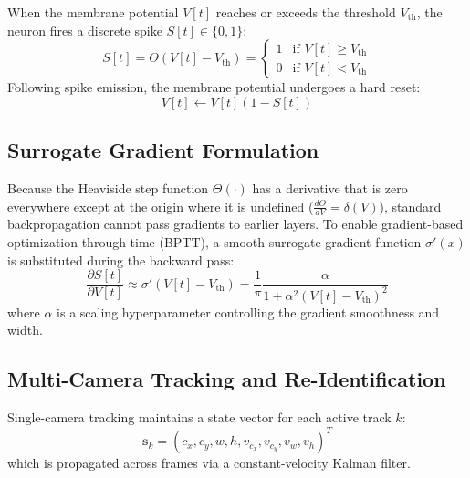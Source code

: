 \documentclass[12pt,a4paper]{report}
\begin{document}
When the membrane potential $V[t]$ reaches or exceeds the threshold $V_{\text{th}}$, the neuron fires a discrete spike $S[t] \in \{0, 1\}$:
\begin{equation}
    S[t] = \Theta(V[t] - V_{\text{th}}) = 
    \begin{cases} 
      1 & \text{if } V[t] \ge V_{\text{th}} \\ 
      0 & \text{if } V[t] < V_{\text{th}} 
   \end{cases}
\end{equation}
Following spike emission, the membrane potential undergoes a hard reset:
\begin{equation}
    V[t] \leftarrow V[t] (1 - S[t])
\end{equation}

\subsection{Surrogate Gradient Formulation}
Because the Heaviside step function $\Theta(\cdot)$ has a derivative that is zero everywhere except at the origin where it is undefined ($\frac{d\Theta}{dV} = \delta(V)$), standard backpropagation cannot pass gradients to earlier layers. To enable gradient-based optimization through time (BPTT), a smooth surrogate gradient function $\sigma'(x)$ is substituted during the backward pass:
\begin{equation}
    \frac{\partial S[t]}{\partial V[t]} \approx \sigma'(V[t] - V_{\text{th}}) = \frac{1}{\pi} \frac{\alpha}{1 + \alpha^2 (V[t] - V_{\text{th}})^2}
\end{equation}
where $\alpha$ is a scaling hyperparameter controlling the gradient smoothness and width.

\subsection{Multi-Camera Tracking and Re-Identification}
Single-camera tracking maintains a state vector for each active track $k$:
\begin{equation}
    \mathbf{s}_k = (c_x, c_y, w, h, v_{c_x}, v_{c_y}, v_w, v_h)^T
\end{equation}
which is propagated across frames via a constant-velocity Kalman filter.
\end{document}
